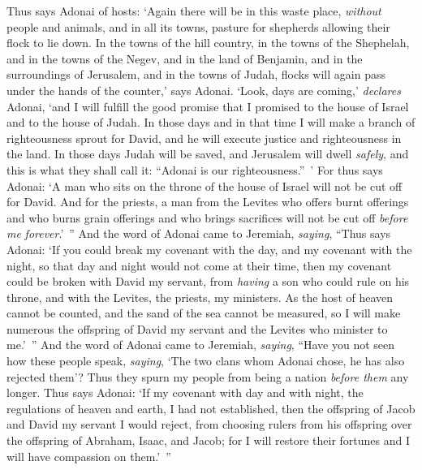 \begin{biblechapter}
\verse Thus says Adonai of hosts: ‘Again there will be in this waste place, \textit{without} people and animals, and in all its towns, pasture for shepherds allowing their flock to lie down.
\verse In the towns of the hill country, in the towns of the Shephelah, and in the towns of the Negev, and in the land of Benjamin, and in the surroundings of Jerusalem, and in the towns of Judah, flocks will again pass under the hands of the counter,’ says Adonai.
\verse ‘Look, days are coming,’ \textit{declares} Adonai, ‘and I will fulfill the good promise that I promised to the house of Israel and to the house of Judah.
\verse In those days and in that time I will make a branch of righteousness sprout for David, and he will execute justice and righteousness in the land.
\verse In those days Judah will be saved, and Jerusalem will dwell \textit{safely}, and this is what they shall call it: “Adonai is our righteousness.” ’
\verse For thus says Adonai: ‘A man who sits on the throne of the house of Israel will not be cut off for David.
\verse And for the priests, a man from the Levites who offers burnt offerings and who burns grain offerings and who brings sacrifices will not be cut off \textit{before me} \textit{forever}.’ ”
\verse And the word of Adonai came to Jeremiah, \textit{saying},
\verse “Thus says Adonai: ‘If you could break my covenant with the day, and my covenant with the night, so that day and night would not come at their time,
\verse then my covenant could be broken with David my servant, from \textit{having} a son who could rule on his throne, and with the Levites, the priests, my ministers.
\verse As the host of heaven cannot be counted, and the sand of the sea cannot be measured, so I will make numerous the offspring of David my servant and the Levites who minister to me.’ ”
\verse And the word of Adonai came to Jeremiah, \textit{saying},
\verse “Have you not seen how these people speak, \textit{saying}, ‘The two clans whom Adonai chose, he has also rejected them’? Thus they spurn my people from being a nation \textit{before them} any longer.
\verse Thus says Adonai: ‘If my covenant with day and with night, the regulations of heaven and earth, I had not established,
\verse then the offspring of Jacob and David my servant I would reject, from choosing rulers from his offspring over the offspring of Abraham, Isaac, and Jacob; for I will restore their fortunes and I will have compassion on them.’ ”
\end{biblechapter}

